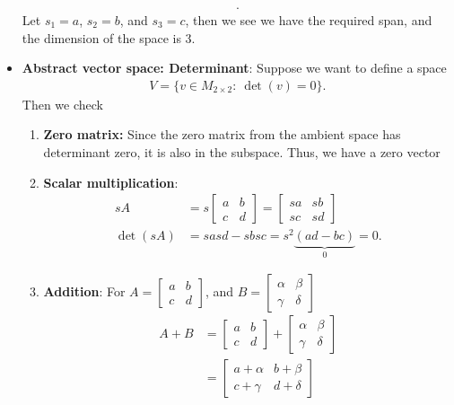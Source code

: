 \documentclass{report}
\begin{document}
\begin{itemize}
\begin{align*}
            .\end{align*}
            Let $s_1 = a$, $s_2 = b$, and $s_3 = c$, then we see we have the required span, and the dimension of the space is 3.
        \item \textbf{Abstract vector space: Determinant}: Suppose we want to define a space
            \begin{align*}
                V = \{v \in M_{2\times 2}:\ \det(v) = 0\}
            .\end{align*}
            Then we check
            \begin{enumerate}
                \item \textbf{Zero matrix:} Since the zero matrix from the ambient space has determinant zero, it is also in the subspace. Thus, we have a zero vector
                \item \textbf{Scalar multiplication}: 
                    \begin{align*}
                        sA &= s \begin{bmatrix} a & b \\ c & d \end{bmatrix} = \begin{bmatrix} sa & sb \\ sc & sd \end{bmatrix}  \\
                        \det(sA)&= sasd - sbsc = s^{2}\underbrace{(ad - bc)}_{0} = 0
                    .\end{align*}
                \item \textbf{Addition}: For $A = \begin{bmatrix} a & b \\ c & d\end{bmatrix} $, and $B = \begin{bmatrix} \alpha & \beta \\ \gamma & \delta \end{bmatrix} $
                    \begin{align*}
                        A   + B &= \begin{bmatrix} a & b \\ c & d \end{bmatrix} + \begin{bmatrix} \alpha & \beta \\ \gamma & \delta \end{bmatrix}  \\
                                &= \begin{bmatrix} a + \alpha & b + \beta \\ c + \gamma & d + \delta\end{bmatrix} \\

\end{align*}
\end{enumerate}
\end{itemize}
\end{document}
